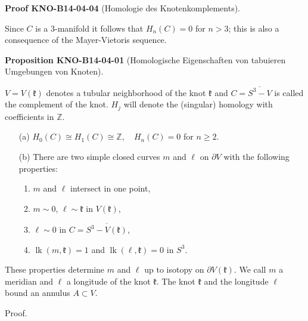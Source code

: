 \documentclass[10pt, letterpaper]{article}
\newcommand{\CustomHeading}[3]{%
  \par\medskip\noindent%
  \textbf{#1 #2} \textnormal{(#3)}.\enskip%
}
\newenvironment{PROP}[2]{\begin{unitbox}\CustomHeading{Proposition}{#1}{#2}}{\end{unitbox}}
\newenvironment{PROOF}[2]{\begin{unitbox}\CustomHeading{Proof}{#1}{#2}}{\end{unitbox}}
\begin{document}
\begin{PROOF}{KNO-B14-04-04}{Homologie des Knotenkomplements}
Since $C$ is a 3-manifold it follows that $H_{n}(C)=0$ for $n>3$; this is also a consequence of the Mayer-Vietoris sequence.
\end{PROOF}




\begin{PROP}{KNO-B14-04-01}{Homologische Eigenschaften von tabuieren Umgebungen von Knoten}
$V=V(\mathfrak{k})$ denotes a tubular neighborhood of the knot $\mathfrak{k}$ and $C=\overline{S^{3}-V}$ is called the complement of the knot. $H_{j}$ will denote the (singular) homology with coefficients in $\mathbb{Z}$.

\begin{itemize}
  \item[(a)] \( H_{0}(C) \cong H_{1}(C) \cong \mathbb{Z}, \quad H_{n}(C) = 0 \) for \( n \geq 2 \).
  
  \item[(b)] There are two simple closed curves \( m \) and \( \ell \) on \( \partial V \) with the following properties:
  \begin{enumerate}
    \item \( m \) and \( \ell \) intersect in one point,
    \item \( m \sim 0 \), \( \ell \sim \mathfrak{k} \) in \( V(\mathfrak{k}) \),
    \item \( \ell \sim 0 \) in \( C = \overline{S^{3} - V(\mathfrak{k})} \),
    \item \( \operatorname{lk}(m, \mathfrak{k}) = 1 \) and \( \operatorname{lk}(\ell, \mathfrak{k}) = 0 \) in \( S^{3} \).
  \end{enumerate}
\end{itemize}

These properties determine $m$ and $\ell$ up to isotopy on $\partial V(\mathfrak{k})$. We call $m$ a meridian and $\ell$ a longitude of the knot $\mathfrak{k}$. The knot $\mathfrak{k}$ and the longitude $\ell$ bound an annulus $A \subset V$.
\end{PROP}

Proof. 
\end{document}
